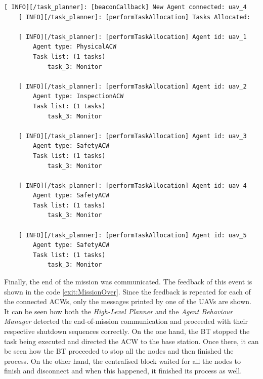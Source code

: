 \begin{lstlisting}[caption={Feedback messages printed after an \gls{ACW} reconnects}, breaklines=true, label=exit:Reconnection]
    [ INFO][/task_planner]: [beaconCallback] New Agent connected: uav_4
    [ INFO][/task_planner]: [performTaskAllocation] Tasks Allocated:
    
    [ INFO][/task_planner]: [performTaskAllocation] Agent id: uav_1
        Agent type: PhysicalACW
        Task list: (1 tasks)
            task_3: Monitor
    
    [ INFO][/task_planner]: [performTaskAllocation] Agent id: uav_2
        Agent type: InspectionACW
        Task list: (1 tasks)
            task_3: Monitor
    
    [ INFO][/task_planner]: [performTaskAllocation] Agent id: uav_3
        Agent type: SafetyACW
        Task list: (1 tasks)
            task_3: Monitor
    
    [ INFO][/task_planner]: [performTaskAllocation] Agent id: uav_4
        Agent type: SafetyACW
        Task list: (1 tasks)
            task_3: Monitor
    
    [ INFO][/task_planner]: [performTaskAllocation] Agent id: uav_5
        Agent type: SafetyACW
        Task list: (1 tasks)
            task_3: Monitor
\end{lstlisting}

Finally, the end of the mission was communicated. The feedback of this event is shown in the code \ref{exit:MissionOver}. Since the feedback is repeated for each of the connected \glspl{ACW}, only the messages printed by one of the \glspl{UAV} are shown. It can be seen how both the \emph{High-Level Planner} and the \emph{Agent Behaviour Manager} detected the end-of-mission communication and proceeded with their respective shutdown sequences correctly. On the one hand, the \gls{BT} stopped the task being executed and directed the \gls{ACW} to the base station. Once there, it can be seen how the \gls{BT} proceeded to stop all the nodes and then finished the process. On the other hand, the centralised block waited for all the nodes to finish and disconnect and when this happened, it finished its process as well. 

